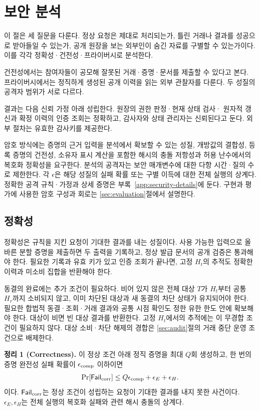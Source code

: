\section{보안 분석}
\label{sec:security}
\label{sec:analysis}

이 절은 세 질문을 다룬다. 정상 요청은 제대로 처리되는가,
틀린 거래나 결과를 성공으로 받아들일 수 있는가,
공개 원장을 보는 외부인이 숨긴 자료를 구별할 수 있는가이다.
이를 각각 정확성·건전성·프라이버시로 분석한다.

건전성에서는 참여자들이 공모해 잘못된 거래·증명·문서를 제출할 수
있다고 본다. 프라이버시에서는 정직하게 생성된 공개 이력을 읽는
외부 관찰자를 다룬다. 두 성질의 공격자 범위가 서로 다르다.

결과는 다음 신뢰 가정 아래 성립한다. 원장의 권한 판정·현재 상태 검사·
원자적 갱신과 확정 이력의 인증 조회는 정확하고,
감사자와 상태 관리자는 신뢰된다고 둔다.
외부 절차는 유효한 감사키를 제공한다.

암호 방식에는 증명의 근거 입력을 분석에서 확보할 수 있는 성질,
개방값의 결합성, 등록 증명의 건전성, 소유자 표시 계산을 포함한
해시의 충돌 저항성과 허용 난수에서의 복호화 정확성을 요구한다.
분석의 공격자는 보안 매개변수에 대한 다항 시간·질의 수로 제한한다.
각 $\epsilon$은 해당 성질의 실패 확률 또는 구별 이득에 대한
전체 실행의 상계다.
정확한 공격 규칙·가정과 상세 증명은 부록~\ref{app:security-details}에 둔다.
구현과 평가에 사용한 암호 구성과 회로는 \ref{sec:evaluation}절에서 설명한다.

\subsection{정확성}
\label{sec:correctness-proof}

정확성은 규칙을 지킨 요청이 기대한 결과를 내는 성질이다.
사용 가능한 입력으로 올바른 분할 증명을 제출하면 두 출력을 기록하고,
정상 발급 문서의 공개 검증은 통과해야 한다.
필요한 기록과 유효 키가 있고 인증 조회가 끝나면,
고정 $H_t$의 추적도 정확한 이력과 미소비 집합을 반환해야 한다.

동결의 완료에는 추가 조건이 필요하다.
비어 있지 않은 전체 대상 $T$가 $H_t$부터 공통 $H_r$까지
소비되지 않고, 이미 차단된 대상과 새 동결의 차단 상태가 유지되어야 한다.
필요한 합법적 동결·조회·거래 결과와 공통 시점 확인도 정한 유한
한도 안에 확보해야 한다. 대상이 비면 빈 대상 결과를 반환한다.
고정 $H_t$에서의 추적에는 이 무경합 조건이 필요하지 않다.
대상 소비·차단 해제의 경합은 \ref{sec:audit}절의 거래 중단
운영 조건으로 배제한다.

\textbf{정리 1 (Correctness).}
이 정상 조건 아래 정직 증명을 최대 $Q$회 생성하고,
한 번의 증명 완전성 실패 확률이 $\epsilon_{\rm comp}$ 이하이면
\begin{equation}
 \Pr[\mathsf{Fail}_{\rm corr}]
 \leq Q\epsilon_{\rm comp}+\epsilon_E+\epsilon_H.
 \label{eq:correctness-bound}
\end{equation}
이다. $\mathsf{Fail}_{\rm corr}$는 정상 조건이 성립하는 요청이
기대한 결과를 내지 못한 사건이다.
$\epsilon_E,\epsilon_H$는 전체 실행의 복호화 실패와 관련 해시
충돌의 상계다.

